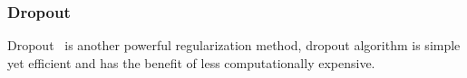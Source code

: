 \subsubsection{Dropout}

Dropout~\cite{JMLR:v15:srivastava14a} is another powerful regularization method, dropout algorithm is simple yet efficient and has the benefit of less computationally expensive. 